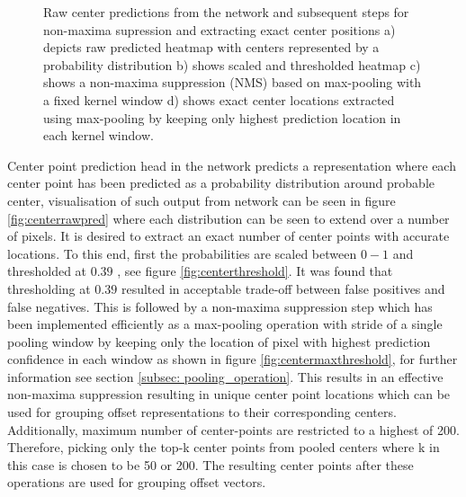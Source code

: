 \begin{figure}[!ht]
{        \label{fig:centermaxthreshold}}
    \caption[Center Position Extraction ] {Raw center predictions from the network and subsequent steps for non-maxima supression and extracting exact center positions a) depicts raw predicted heatmap with centers represented by a probability distribution b) shows scaled and thresholded heatmap c) shows a non-maxima suppression (NMS) based on max-pooling with a fixed kernel window d) shows exact center locations extracted using max-pooling by keeping only highest prediction location in each kernel window.}
    \label{fig:centerpred_preprocessing}
\end{figure}

Center point prediction head in the network predicts a representation where each center point has been predicted as a probability distribution around probable center, visualisation of such output from network can be seen in figure \ref{fig:centerrawpred} where each distribution can be seen to extend over a number of pixels. It is desired to extract an exact number of center points with accurate locations. To this end, first the probabilities are scaled between $0-1$ and thresholded at $0.39$ , see figure \ref{fig:centerthreshold}. It was found that thresholding at $0.39$ resulted in acceptable trade-off between false positives and false negatives.   This is followed by a non-maxima suppression step which has been implemented efficiently as a max-pooling operation with stride of a single pooling window by keeping only the location of pixel with highest prediction confidence in each window as shown in figure \ref{fig:centermaxthreshold}, for further information see section \ref{subsec: pooling_operation}. This results in an effective non-maxima suppression resulting in unique center point locations which can be used for grouping offset representations to their corresponding centers. Additionally, maximum number of center-points are restricted to a highest of 200. Therefore, picking only the top-k center points from pooled centers where k in this case is chosen to be 50 or 200. The resulting center points after these operations are used for grouping offset vectors.




